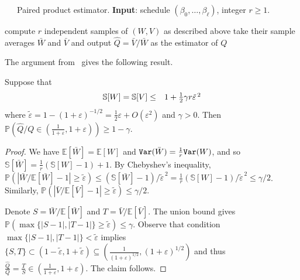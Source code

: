 \documentclass[final,12pt]{colt2018}
\def\E{{\mathbb E}}
\def\P{{\mathbb P}}
\def\Vrel(#1){{{\mathbb S}[{#1}]}}
\begin{document}
\begin{algorithm}[h]
\caption{~~~Paired product estimator. {\bf Input}:  schedule $(\beta_0,\ldots,\beta_\ell)$, integer $r\ge 1$. \label{alg:wrapper}}
\begin{algorithmic}[1]
\State compute $r$  independent samples of $(W,V)$ as described above
\State take their sample averages $\bar W$ and $\bar V$ and output $\hat Q=\bar V/\bar W$ as the estimator of $Q$
\end{algorithmic}
\end{algorithm}

The argument from~\citep{Huber:Gibbs} gives the following result.
\begin{lemma}\label{lemma:PairedProduct}
Suppose that 
\begin{eqnarray}
\Vrel(W) = \Vrel(V)  &\le& \mbox{$   1+ \frac{1}{2}\gamma r\tilde\varepsilon^{\,2}    $}
\label{eq:Scondition}
\end{eqnarray}
where $\tilde\varepsilon=1-(1+\varepsilon)^{-1/2}=\frac{1}{2}\varepsilon + O(\varepsilon^2)$ and $\gamma>0$.
Then $\P(\hat Q/Q\in (\frac{1}{1+\varepsilon},1+\varepsilon))\ge 1-\gamma$.
\end{lemma}
\begin{proof}
We have $\E[\bar W]=\E[W]$ and ${\tt Var}(\bar W)=\frac{1}{r}{\tt Var}(W)$, and so
 $\Vrel(\bar W)=\frac{1}{r}(\Vrel(W)-1)+1$.
By Chebyshev's inequality, 
$\P(|\bar W/\E[\bar W]-1|\ge \tilde\varepsilon ) \le (\Vrel(\bar W)-1) / \tilde\varepsilon^{\,2} = \frac{1}{r} (\Vrel( W)-1) / \tilde\varepsilon^{\,2} \le \gamma/2$.
Similarly, $\P(|\bar V/\E[\bar V]-1|\ge \tilde\varepsilon ) \le \gamma/2$.

Denote $S=\bar W/\E[\bar W]$ and $T=\bar V/\E[\bar V]$. The union bound gives $\P(\max\{|S-1|,|T-1|\}\ge \tilde\varepsilon) \le \gamma$.
Observe that condition $\max\{|S-1|,|T-1|\}<\tilde\varepsilon$ implies $\{S,T\}\subset(1-\tilde\varepsilon,1+\tilde\varepsilon)\subseteq(\frac{1}{(1+\varepsilon)^{1/2}},(1+\varepsilon)^{1/2})$ 
and thus $\frac{\hat Q}Q=\frac{T}{S}\in(\frac{1}{1+\varepsilon},1+\varepsilon)$.
The claim follows.
\end{proof}
\end{document}

